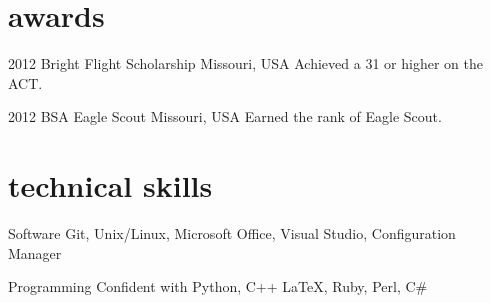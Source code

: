 \documentclass[]{friggeri-cv} %
\begin{document}

\section{awards}

\begin{entrylist}


\entry
{2012}
{Bright Flight Scholarship}
{Missouri, USA} 
{} 
{Achieved a 31 or higher on the ACT.}

\entry
{2012}
{BSA Eagle Scout}
{Missouri, USA} 
{} 
{Earned the rank of Eagle Scout.}



\end{entrylist}


\section{technical skills}

\begin{entrylist}




\entry
{}
{Software}
{}
{}
{
Git, Unix/Linux, Microsoft Office, Visual Studio, Configuration Manager
}



\entry
{}
{Programming}
{}
{}
{
Confident with Python, C++ \LaTeX, Ruby, Perl, C\#
}




\end{entrylist}



\end{document}
